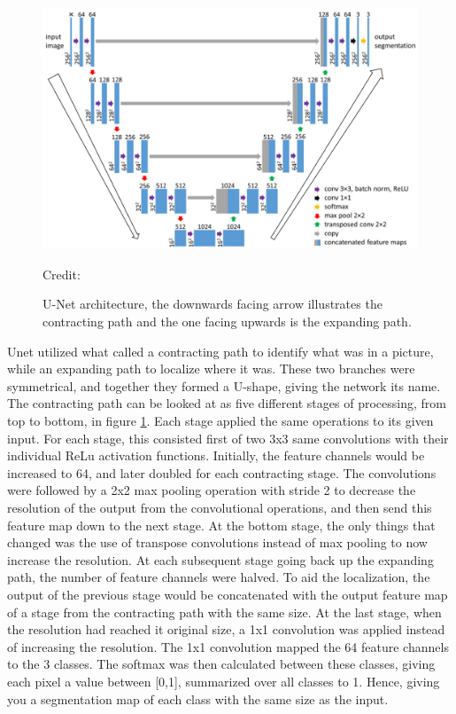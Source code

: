     \begin{figure}[H]
        \centering
        \includegraphics[scale=0.5]{figures/unet_arrows.png}
        \caption[U-Net architecture]{U-Net architecture, the downwards facing arrow illustrates the contracting path and the one facing upwards is the expanding path.}
      	\medskip 
        \label{unet_fig}
        \hspace*{15pt}\hbox{\scriptsize Credit: \citeauthor{brautaset2020acoustic}\cite{brautaset2020acoustic}}
    \end{figure}
    
    Unet utilized what \citeauthor{unet_ronneberger2015}\cite{unet_ronneberger2015} called a contracting path to identify what was in a picture, while an expanding path to localize where it was. These two branches were symmetrical, and together they formed a U-shape, giving the network its name. The contracting path can be looked at as five different stages of processing, from top to bottom, in figure \ref{unet_fig}. Each stage applied the same operations to its given input. For each stage, this consisted first of two 3x3 same convolutions with their individual ReLu activation functions. Initially, the feature channels would be increased to 64, and later doubled for each contracting stage. The convolutions were followed by a 2x2 max pooling operation with stride 2 to decrease the resolution of the output from the convolutional operations, and then send this feature map down to the next stage. At the bottom stage, the only things that changed was the use of transpose convolutions instead of max pooling to now increase the resolution. At each subsequent stage going back up the expanding path, the number of feature channels were halved. To aid the localization, the output of the previous stage would be concatenated with the output feature map of a stage from the contracting path with the same size. At the last stage, when the resolution had reached it original size, a 1x1 convolution was applied instead of increasing the resolution. The 1x1 convolution mapped the 64 feature channels to the 3 classes. The softmax was then calculated between these classes, giving each pixel a value between [0,1], summarized over all classes to 1. Hence, giving you a segmentation map of each class with the same size as the input. 
    
